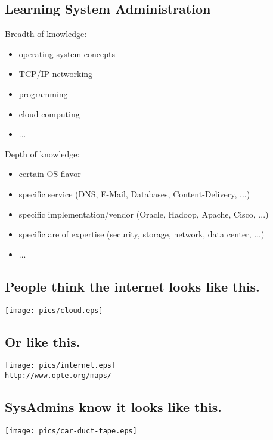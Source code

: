 \documentclass[xga]{xdvislides}
\begin{document}
\subsection{Learning System Administration}

Breadth of knowledge:
\begin{itemize}
	\item operating system concepts
	\item TCP/IP networking
	\item programming
	\item cloud computing
	\item ...
\end{itemize}
\vspace{.5in}

Depth of knowledge:
\begin{itemize}
	\item certain OS flavor
	\item specific service (DNS, E-Mail, Databases, Content-Delivery, ...)
	\item specific implementation/vendor (Oracle, Hadoop, Apache, Cisco, ...)
	\item specific are of expertise (security, storage, network, data center, ...)
	\item ...
\end{itemize}

\subsection{People think the internet looks like this.}
\begin{center}
	\texttt{[image: pics/cloud.eps]}
\end{center}

\subsection{Or like this.}
\begin{center}
	\texttt{[image: pics/internet.eps]} \\
	\small
	{\tt http://www.opte.org/maps/}
	\Normalsize
\end{center}

\subsection{SysAdmins know it looks like this.}
\vspace*{\fill}
\begin{center}
    \texttt{[image: pics/car-duct-tape.eps]}
\end{center}
\vspace*{\fill}
\end{document}
